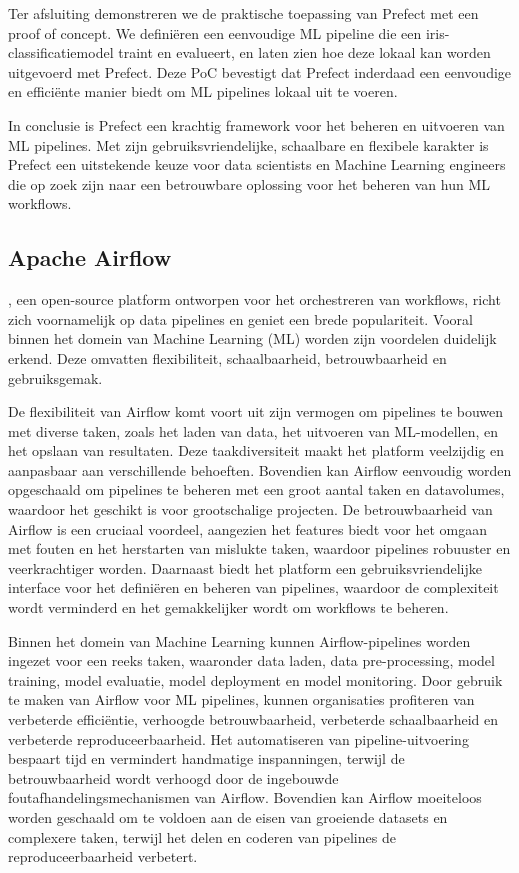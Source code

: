 Ter afsluiting demonstreren we de praktische toepassing van Prefect met een proof of concept. We definiëren een eenvoudige ML pipeline die een iris-classificatiemodel traint en evalueert, en laten zien hoe deze lokaal kan worden uitgevoerd met Prefect. Deze PoC bevestigt dat Prefect inderdaad een eenvoudige en efficiënte manier biedt om ML pipelines lokaal uit te voeren.

In conclusie is Prefect een krachtig framework voor het beheren en uitvoeren van ML pipelines. Met zijn gebruiksvriendelijke, schaalbare en flexibele karakter is Prefect een uitstekende keuze voor data scientists en Machine Learning engineers die op zoek zijn naar een betrouwbare oplossing voor het beheren van hun ML workflows.
\subsection{Apache Airflow}

\textcite{ApacheAirflow2024}, een open-source platform ontworpen voor het orchestreren van workflows, richt zich voornamelijk op data pipelines en geniet een brede populariteit. Vooral binnen het domein van Machine Learning (ML) worden zijn voordelen duidelijk erkend. Deze omvatten flexibiliteit, schaalbaarheid, betrouwbaarheid en gebruiksgemak.

De flexibiliteit van Airflow komt voort uit zijn vermogen om pipelines te bouwen met diverse taken, zoals het laden van data, het uitvoeren van ML-modellen, en het opslaan van resultaten. Deze taakdiversiteit maakt het platform veelzijdig en aanpasbaar aan verschillende behoeften. Bovendien kan Airflow eenvoudig worden opgeschaald om pipelines te beheren met een groot aantal taken en datavolumes, waardoor het geschikt is voor grootschalige projecten. De betrouwbaarheid van Airflow is een cruciaal voordeel, aangezien het features biedt voor het omgaan met fouten en het herstarten van mislukte taken, waardoor pipelines robuuster en veerkrachtiger worden. Daarnaast biedt het platform een gebruiksvriendelijke interface voor het definiëren en beheren van pipelines, waardoor de complexiteit wordt verminderd en het gemakkelijker wordt om workflows te beheren.

Binnen het domein van Machine Learning kunnen Airflow-pipelines worden ingezet voor een reeks taken, waaronder data laden, data pre-processing, model training, model evaluatie, model deployment en model monitoring. Door gebruik te maken van Airflow voor ML pipelines, kunnen organisaties profiteren van verbeterde efficiëntie, verhoogde betrouwbaarheid, verbeterde schaalbaarheid en verbeterde reproduceerbaarheid. Het automatiseren van pipeline-uitvoering bespaart tijd en vermindert handmatige inspanningen, terwijl de betrouwbaarheid wordt verhoogd door de ingebouwde foutafhandelingsmechanismen van Airflow. Bovendien kan Airflow moeiteloos worden geschaald om te voldoen aan de eisen van groeiende datasets en complexere taken, terwijl het delen en coderen van pipelines de reproduceerbaarheid verbetert.

